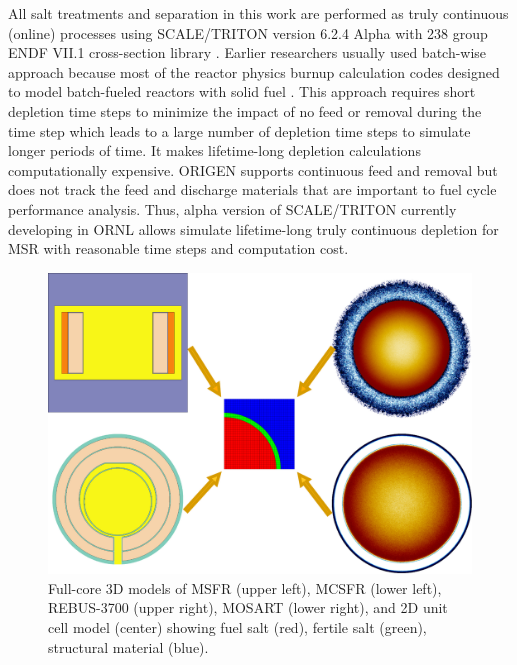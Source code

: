 \documentclass{anstrans}
\begin{document}
All salt treatments and separation in this work are performed as truly continuous (online) processes using SCALE/TRITON version 6.2.4 Alpha with 238 group ENDF VII.1 cross-section library \cite{rearden_scale_2016}.  Earlier researchers usually used batch-wise approach because most of the reactor physics burnup calculation codes designed to model batch-fueled reactors with solid fuel \cite{powers_new_2013, jeong_equilibrium_2016, betzler_molten_2017, rykhlevskii_online_2017, betzler_fuel_2018}. This approach requires short depletion time steps to minimize the impact of no feed or removal during the time step which leads to a large number of depletion time steps to simulate longer periods of time. It makes lifetime-long depletion calculations computationally expensive. ORIGEN \cite{gauld_isotopic_2011} supports continuous feed and removal but does not track the feed and discharge materials that are important to fuel cycle performance analysis. Thus, alpha version of SCALE/TRITON currently developing in \gls{ORNL} allows simulate lifetime-long truly continuous depletion for \gls{MSR} with reasonable time steps and computation cost.
\begin{figure}[!htb]
  \centering
  \includegraphics[scale=0.265]{./Figures/fsmsrs.pdf}
  \caption{Full-core 3D models of \gls{MSFR} (upper left), \gls{MCSFR} (lower left), REBUS-3700 (upper right), \gls{MOSART} (lower right), and 2D unit cell model (center) showing fuel salt (red), fertile salt (green), structural material (blue).}   
  \label{fig:unit_cell}
\end{figure}
\end{document}
